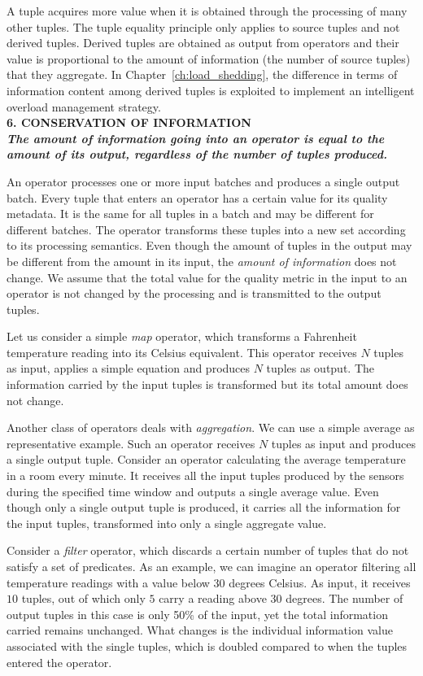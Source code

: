 A tuple acquires more value when it is obtained through the processing of many other tuples. The tuple
equality principle only applies to source tuples and not derived tuples. Derived tuples are obtained as
output from operators and their value is proportional to the amount of information (\ie the number of source
tuples) that they aggregate. In Chapter~\ref{ch:load_shedding}, the difference in terms of information content among derived tuples is exploited
to implement an intelligent overload management strategy. \\

\textbf{6. CONSERVATION OF INFORMATION \\ \textit{The amount of information going into an operator is
equal to the amount of its output, regardless of the number of tuples produced.}}

An operator processes one or more input batches and produces a single output batch. Every tuple that
enters an operator has a certain value for its quality metadata.  It is the same for all tuples in a
batch and may be different for different batches. The operator transforms these tuples into a new set
according to its processing semantics. Even though the amount of tuples in the output may be different from
the amount in its input, the \textit{amount of information} does not change. We assume that the
total value for the quality metric in the input to an operator is not changed by the processing and is
transmitted to the output tuples.

 	Let us consider a simple \textit{map} operator, which transforms a Fahrenheit temperature reading into
 	its Celsius equivalent. This operator receives $N$ tuples as input, applies a simple equation and
 	produces $N$ tuples as output. The information carried by the input tuples is transformed but its
 	total amount does not change. 

Another class of operators deals with \textit{aggregation}. We can use a simple average as representative
example. Such an operator receives $N$ tuples as input and produces a single output tuple.
Consider an operator calculating the average temperature in a room every minute. It receives all the
input tuples produced by the sensors during the specified time window and outputs a single average value.
Even though only a single output tuple is produced, it carries all the information for the input tuples,
transformed into only a single aggregate value.

Consider a \textit{filter} operator, which discards a certain number of tuples that do not satisfy a set
of predicates. As an example, we can imagine an operator filtering all temperature readings with a value
below $30$ degrees Celsius. As input, it receives $10$ tuples, out of which only $5$ carry a reading
above $30$ degrees. The number of output tuples in this case is only 50\% of the input, yet the total
information carried remains unchanged. What changes is the individual information value associated with
the single tuples, which is doubled compared to when the tuples entered the operator.

